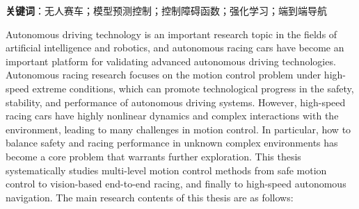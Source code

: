 \noindent \textbf{关键词}：无人赛车；模型预测控制；控制障碍函数；强化学习；端到端导航

\cleardoublepage
{}

Autonomous driving technology is an important research topic in the fields of artificial intelligence and robotics, and autonomous racing cars have become an important platform for validating advanced autonomous driving technologies. Autonomous racing research focuses on the motion control problem under high-speed extreme conditions, which can promote technological progress in the safety, stability, and performance of autonomous driving systems. However, high-speed racing cars have highly nonlinear dynamics and complex interactions with the environment, leading to many challenges in motion control. In particular, how to balance safety and racing performance in unknown complex environments has become a core problem that warrants further exploration. This thesis systematically studies multi-level motion control methods from safe motion control to vision-based end-to-end racing, and finally to high-speed autonomous navigation. The main research contents of this thesis are as follows:

